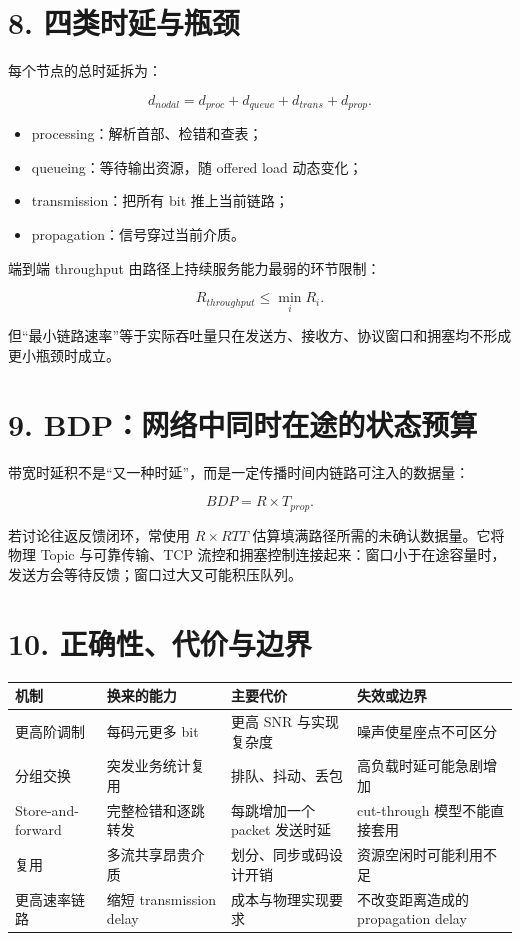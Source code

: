 \documentclass[UTF8,fontset=none,11pt,a4paper]{ctexart}
\providecommand{\tightlist}{\setlength{\itemsep}{0pt}\setlength{\parskip}{0pt}}
\begin{document}
\section{8.
四类时延与瓶颈}\label{6-ux56dbux7c7bux65f6ux5ef6ux4e0eux74f6ux9888}

每个节点的总时延拆为：

\[
d_{nodal}=d_{proc}+d_{queue}+d_{trans}+d_{prop}.
\]

\begin{itemize}
\tightlist
\item
  processing：解析首部、检错和查表；
\item
  queueing：等待输出资源，随 offered load 动态变化；
\item
  transmission：把所有 bit 推上当前链路；
\item
  propagation：信号穿过当前介质。
\end{itemize}

端到端 throughput 由路径上持续服务能力最弱的环节限制：

\[
R_{throughput}\le \min_i R_i.
\]

但``最小链路速率''等于实际吞吐量只在发送方、接收方、协议窗口和拥塞均不形成更小瓶颈时成立。

\section{9.
BDP：网络中同时在途的状态预算}\label{7-bdpux7f51ux7edcux4e2dux540cux65f6ux5728ux9014ux7684ux72b6ux6001ux9884ux7b97}

带宽时延积不是``又一种时延''，而是一定传播时间内链路可注入的数据量：

\[
BDP=R\times T_{prop}.
\]

若讨论往返反馈闭环，常使用 \(R\times RTT\)
估算填满路径所需的未确认数据量。它将物理 Topic 与可靠传输、TCP
流控和拥塞控制连接起来：窗口小于在途容量时，发送方会等待反馈；窗口过大又可能积压队列。

\section{10.
正确性、代价与边界}\label{8-ux6b63ux786eux6027ux4ee3ux4ef7ux4e0eux8fb9ux754c}

\begin{longtable}[]{@{}llll@{}}
\toprule\noalign{}
机制 & 换来的能力 & 主要代价 & 失效或边界 \\
\midrule\noalign{}
\endhead
\bottomrule\noalign{}
\endlastfoot
更高阶调制 & 每码元更多 bit & 更高 SNR 与实现复杂度 &
噪声使星座点不可区分 \\
分组交换 & 突发业务统计复用 & 排队、抖动、丢包 &
高负载时延可能急剧增加 \\
Store-and-forward & 完整检错和逐跳转发 & 每跳增加一个 packet 发送时延 &
cut-through 模型不能直接套用 \\
复用 & 多流共享昂贵介质 & 划分、同步或码设计开销 &
资源空闲时可能利用不足 \\
更高速率链路 & 缩短 transmission delay & 成本与物理实现要求 &
不改变距离造成的 propagation delay \\
\end{longtable}
\end{document}
